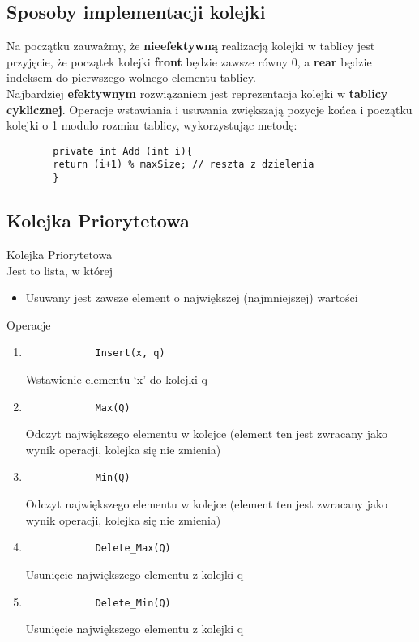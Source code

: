 \documentclass[main.tex]{subfiles}
\begin{document}
    \subsection{Sposoby implementacji kolejki}

    Na początku zauważmy, że \textbf{nieefektywną} realizacją kolejki w tablicy jest przyjęcie, że
    początek kolejki \textbf{front} będzie zawsze równy 0, a \textbf{rear} będzie indeksem do pierwszego
    wolnego elementu tablicy.\\


    Najbardziej \textbf{efektywnym} rozwiązaniem jest reprezentacja kolejki w \textbf{tablicy cyklicznej}.
    Operacje wstawiania i usuwania zwiększają pozycje końca i początku kolejki o 1 modulo
    rozmiar tablicy, wykorzystując metodę:
    \begin{verbatim}
        private int Add (int i){
        return (i+1) % maxSize; // reszta z dzielenia
        }
    \end{verbatim}

    \subsection{Kolejka Priorytetowa}
    \begin{definition}
        Kolejka Priorytetowa\\
        Jest to lista, w której
        \begin{itemize}
            \item Usuwany jest zawsze element o największej (najmniejszej) wartości
        \end{itemize}
    \end{definition}

    Operacje
    \begin{enumerate}
        \item
        \begin{verbatim}
            Insert(x, q)
        \end{verbatim}
        Wstawienie elementu ‘x’ do kolejki q
        \item
        \begin{verbatim}
            Max(Q)
        \end{verbatim}
        Odczyt największego elementu w kolejce (element ten jest zwracany jako wynik operacji, kolejka się nie zmienia)
        \item
        \begin{verbatim}
            Min(Q)
        \end{verbatim}
        Odczyt największego elementu w kolejce (element ten jest zwracany jako wynik operacji, kolejka się nie zmienia)
        \item
        \begin{verbatim}
            Delete_Max(Q)
        \end{verbatim}
        Usunięcie największego elementu z kolejki q
        \item
        \begin{verbatim}
            Delete_Min(Q)
        \end{verbatim}
        Usunięcie największego elementu z kolejki q
    \end{enumerate}
\end{document}
